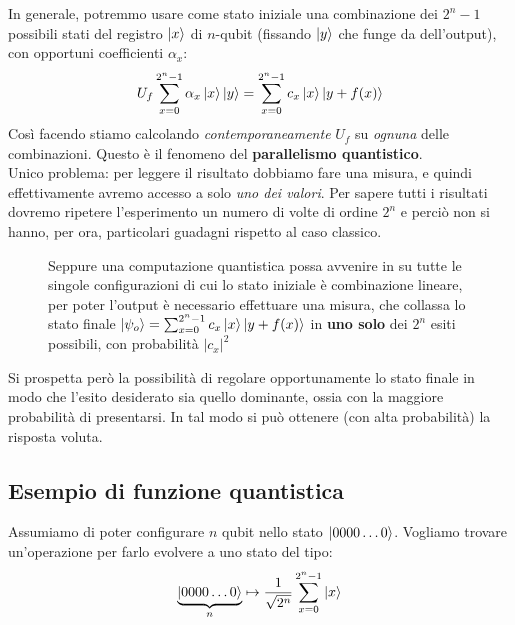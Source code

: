 \documentclass[../../InformazioneQuantistica.tex]{subfiles}
\begin{document}
In generale, potremmo usare come stato iniziale una combinazione dei $2^n-1$ possibili stati del registro $\Ket{x}$ di $n$-qubit (fissando $\Ket{y}$ che funge da  dell'output), con opportuni coefficienti $\alpha_x$:
\begin{align*}
U_f \sum_{x=0}^{2^n-1} \alpha_x \Ket{x}\Ket{y} = \sum_{x=0}^{2^n-1} c_x \Ket{x}\Ket{y+ f(x)}
\end{align*}
Così facendo stiamo calcolando \textit{contemporaneamente} $U_f$ su \textit{ognuna} delle combinazioni. Questo è il fenomeno del \textbf{parallelismo quantistico}.\\
Unico problema: per leggere il risultato dobbiamo fare una misura, e quindi effettivamente avremo accesso a solo \textit{uno dei valori}. Per sapere tutti i risultati dovremo ripetere l'esperimento un numero di volte di ordine $2^n$ e perciò non si hanno, per ora, particolari guadagni rispetto al caso classico.\\

\begin{figure}[H]
\centering

\caption{Seppure una computazione quantistica possa avvenire in  su tutte le singole configurazioni di cui lo stato iniziale è combinazione lineare, per poter  l'output è necessario effettuare una misura, che collassa lo stato finale $\Ket{\psi_o} = \sum_{x=0}^{2^n-1}c_x \Ket{x}\Ket{y+f(x)}$ in \textbf{uno solo} dei $2^n$ esiti possibili, con probabilità $|c_x|^2$\label{fig:quantum-parallelism}}
\end{figure}

Si prospetta però la possibilità di regolare opportunamente lo stato finale in modo che l'esito desiderato sia quello dominante, ossia con la maggiore probabilità di presentarsi. In tal modo si può ottenere (con alta probabilità) la risposta voluta.

\subsection{Esempio di funzione quantistica}
Assumiamo di poter configurare $n$ qubit nello stato $\Ket{0000\dots0}$. Vogliamo trovare un'operazione per farlo evolvere a uno stato del tipo:
\begin{align*}
\underbrace{\Ket{0000\dots0}}_{n} \mapsto \frac{1}{\sqrt{2^n}} \sum_{x=0}^{2^n-1} \Ket{x}
\end{align*}
\end{document}
